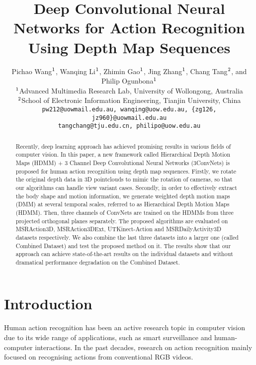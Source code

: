 \documentclass[conference]{IEEEtran}
\begin{document}
\title{Deep Convolutional Neural Networks for Action Recognition Using Depth Map Sequences}


\author{Pichao Wang$^{\rm 1}$, Wanqing Li$^{\rm 1}$, Zhimin Gao$^{\rm 1}$, Jing Zhang$^{\rm 1}$, Chang Tang$^{\rm 2}$, and Philip Ogunbona$^{\rm 1}$\\
$^{\rm 1}$Advanced Multimedia Research Lab, University of Wollongong, Australia\\
$^{\rm 2}$School of Electronic Information Engineering, Tianjin University, China\\
{\tt\small pw212@uowmail.edu.au, wanqing@uow.edu.au, \{zg126, jz960\}@uowmail.edu.au}\\
{\tt\small tangchang@tju.edu.cn, philipo@uow.edu.au}
}

\maketitle

\begin{abstract}
Recently, deep learning approach has achieved promising results in various fields of computer vision. In this paper, a new framework called Hierarchical Depth Motion Maps (HDMM) + 3 Channel Deep Convolutional Neural Networks (3ConvNets) is proposed for human action recognition using depth map sequences. Firstly, we rotate the original depth data in 3D pointclouds to mimic the rotation of cameras, so that our algorithms can handle view variant cases. Secondly, in order to effectively extract the body shape and motion information, we generate weighted depth motion maps (DMM) at several temporal scales, referred to as Hierarchical Depth Motion Maps (HDMM). Then, three channels of ConvNets are trained on the HDMMs from three projected orthogonal planes separately. The proposed algorithms are evaluated on MSRAction3D, MSRAction3DExt, UTKinect-Action and MSRDailyActivity3D datasets respectively. We also combine the last three datasets into a larger one (called Combined Dataset) and test the proposed method on it. The results show that our approach can achieve state-of-the-art results on the individual datasets and without dramatical performance degradation on the Combined Dataset.
\end{abstract}

\section{Introduction}

Human action recognition has been an active research topic in computer vision due to its wide range of applications, such as smart surveillance and human-computer interactions. In the past decades, research on action recognition mainly focused on recognising actions from conventional RGB videos.
\end{document}
